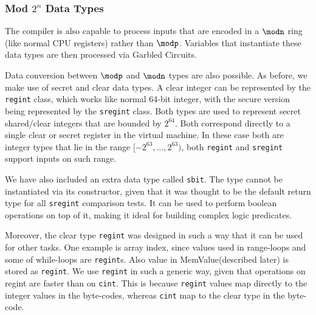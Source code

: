 \subsubsection{Mod $2^n$ Data Types}
\label{sec:mod2n}
The compiler is also capable to process inputs that are encoded in a $\modn$  ring (like normal CPU registers) 
rather than $\modp$. 
Variables that instantiate these data types are then processed via Garbled Circuits. 

Data conversion between $\modp$ and $\modn$ types are also possible. As before, we make use of secret and clear data types. A clear integer can be represented by the \verb|regint| class, which works like normal 64-bit integer,
with the secure version being represented by the \verb|sregint| class.
Both types are used to represent secret shared/clear integers that are bounded by $2^{64}$. 
Both correspond directly to a single clear or secret register in the virtual machine. 
In these case both are integer types that lie in the range $[-2^{63}, \dots, 2^{63})$, both \verb|regint| and \verb|sregint| support inputs on such  range.

We have also included an extra data type called \verb|sbit|. 
The type cannot be instantiated via its constructor, given that it was thought to be the default return 
type for all \verb|sregint| comparison tests. 
It can be used to perform boolean operations on top of it, making it ideal for building complex logic predicates.

Moreover, the clear type \verb|regint| was designed in such a way that it can be used for other tasks. 
One example is array index, since values used in range-loops and some of while-loops are \verb|regint|s. 
Also value in MemValue(described later) is stored as \verb|regint|. 
We use \verb|regint| in such a generic way, given that operations on regint are faster than on \verb|cint|. 
This is because \verb+regint+ values map directly to the integer values in the byte-codes,
whereas \verb+cint+ map to the clear type in the byte-code.

